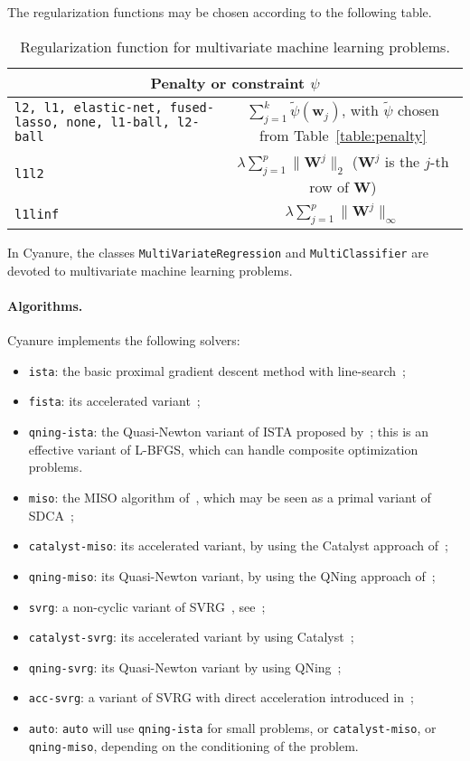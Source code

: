 \documentclass{article}
\def\w{{\mathbf{w}}}
\def\W{{\mathbf{W}}}
\begin{document}
The regularization functions may be chosen according to the following table.
\begin{table}[h!]
   \centering
   \begin{tabular}{|p{5cm}|c|}
      \hline
      \multicolumn{2}{|c|}{Penalty or constraint $\psi$}     \\  
      \hline
      \texttt{l2, l1, elastic-net, fused-lasso, none, l1-ball, l2-ball} & 
      $\sum_{j=1}^k \tilde{\psi}(\w_j)$, with $\tilde{\psi}$ chosen from Table~\ref{table:penalty} \\
      \hline
      \texttt{l1l2} & $\lambda \sum_{j=1}^p \| \W^j\|_2$ ($\W^j$ is the $j$-th row of $\W$) \\ 
      \hline
      \texttt{l1linf} & $\lambda \sum_{j=1}^p \| \W^j\|_\infty$  \\ 
      \hline
   \end{tabular}
   \caption{Regularization function for multivariate machine learning problems.}
\end{table}

In Cyanure, the classes \texttt{MultiVariateRegression} and \texttt{MultiClassifier} are devoted to multivariate machine learning problems.

\paragraph{Algorithms.}
Cyanure implements the following solvers:
\begin{itemize}
   \item \texttt{ista}: the basic proximal gradient descent method with line-search~\citep[see][]{fista};
   \item \texttt{fista}: its accelerated variant~\citep{fista};
   \item \texttt{qning-ista}: the Quasi-Newton variant of ISTA proposed by~\citet{lin2019inexact}; this is an effective variant of L-BFGS, which can handle composite optimization problems.
   \item \texttt{miso}: the MISO algorithm of~\citet{miso}, which may be seen as a primal variant of SDCA~\citep{sdca};
   \item \texttt{catalyst-miso}: its accelerated variant, by using the Catalyst approach of~\citet{lin2018catalyst};
   \item \texttt{qning-miso}: its Quasi-Newton variant, by using the QNing approach of~\citet{lin2019inexact};
   \item \texttt{svrg}: a non-cyclic variant of SVRG~\citep{proxsvrg}, see~\citep{kulunchakov2019estimate};
   \item \texttt{catalyst-svrg}: its accelerated variant by using Catalyst~\citep{lin2018catalyst};
   \item \texttt{qning-svrg}: its Quasi-Newton variant by using QNing~\citep{lin2019inexact};
   \item \texttt{acc-svrg}: a variant of SVRG with direct acceleration introduced in~\citep{kulunchakov2019estimate};
   \item \texttt{auto}: \texttt{auto} will use \texttt{qning-ista} for small problems, or \texttt{catalyst-miso}, or \texttt{qning-miso}, depending on the conditioning of the problem.
\end{itemize}
\end{document}
